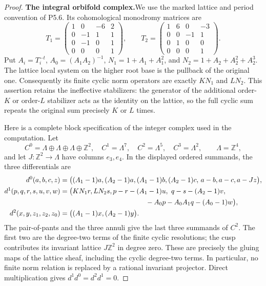 \begin{proof}
\par\medskip\noindent\textbf{The integral orbifold complex.}\enspace We use the marked
lattice and period convention of P5.6.  Its cohomological
monodromy matrices are
\[
 T_1=\begin{pmatrix}
 1&0&-6&2\\0&-1&1&1\\0&-1&0&1\\0&0&0&1
 \end{pmatrix},\qquad
 T_2=\begin{pmatrix}
 1&6&0&-3\\0&0&-1&1\\0&1&0&0\\0&0&0&1
 \end{pmatrix}.
\]
Put \(A_i=T_i^{-t}\), \(A_0=(A_1A_2)^{-1}\),
\(N_1=1+A_1+A_1^2\), and
\(N_2=1+A_2+A_2^2+A_2^3\).  The lattice local system
on the higher root base is the pullback of the original one.
Consequently its finite cyclic norm operators are exactly
\(K N_1\) and \(L N_2\).  This assertion retains the
ineffective stabilizers: the generator of the additional
order-\(K\) or order-\(L\) stabilizer acts as the identity
on the lattice, so the full cyclic sum repeats the original
sum precisely \(K\) or \(L\) times.

Here is a complete block specification of the integer complex
used in the computation.  Let
\[
 C^0=\Lambda\oplus\Lambda\oplus\Lambda\oplus\mathbb Z^2,
 \quad C^1=\Lambda^7,\quad C^2=\Lambda^5,
 \quad C^3=\Lambda^2,
 \qquad \Lambda=\mathbb Z^4,
\]
and let \(J:\mathbb Z^2\to\Lambda\) have columns
\(e_3,e_4\).  In the displayed ordered summands, the three
differentials are
\[
\begin{split}
 d^0(a,b,c,z)={}&\bigl((A_1-1)a,(A_2-1)a,
 (A_1-1)b,(A_2-1)c,\,a-b,a-c,a-Jz\bigr),\\
 d^1(p,q,r,s,u,v,w)={}&\bigl(KN_1r,LN_2s,
 p-r-(A_1-1)u,\ q-s-(A_2-1)v,\\
 &\hspace{39mm}-A_0p-A_0A_1q-(A_0-1)w\bigr),\\
 d^2(x,y,z_1,z_2,z_0)={}&\bigl((A_1-1)x,(A_2-1)y\bigr).
\end{split}
\]
The pair-of-pants and the three annuli give the last three
summands of \(C^2\).  The first two are the degree-two terms
of the finite cyclic resolutions; the cusp contributes its
invariant lattice \(J\mathbb Z^2\) in degree zero.  These
are precisely the gluing maps of the lattice sheaf, including
the cyclic degree-two terms.  In particular, no finite norm
relation is replaced by a rational invariant projector.
Direct multiplication gives \(d^1d^0=d^2d^1=0\).


\end{proof}
